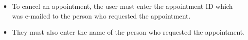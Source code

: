 \begin{itemize}
\begin{itemize}
				\item To cancel an appointment, the user must enter the appointment ID which was e-mailed to the person who requested the appointment.
				\item They must also enter the name of the person who requested the appointment.
			\end{itemize}
	\end{itemize}